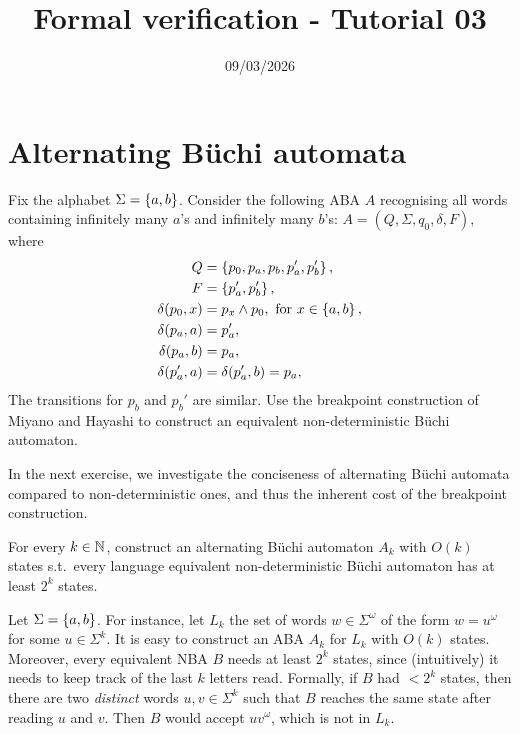 

\title{Formal verification - Tutorial 03}
\date{09/03/2026}



\maketitle

\section*{Alternating Büchi automata}

\begin{exercise}
	Fix the alphabet $\Sigma = \left\{a, b\right\}$.
	Consider the following ABA $A$ recognising all words containing infinitely many $a$'s and infinitely many $b$'s:
	$A = (Q, \Sigma, q_0, \delta, F)$, where
	\begin{align*}
		Q &= \left\{p_0, p_a, p_b, p_a', p_b'\right\}, \\
		F &= \left\{p_a', p_b'\right\}, \\
		\delta(p_0, x) &= p_x \wedge p_0, \text{ for } x \in \left\{a, b\right\}, \\
		\delta(p_a, a) &= p_a', \\
		\delta(p_a, b) &= p_a, \\
		\delta(p_a', a) &= \delta(p_a', b) = p_a, \\
	\end{align*}
	The transitions for $p_b$ and $p_b'$ are similar.
	Use the breakpoint construction of Miyano and Hayashi to construct an equivalent non-deterministic Büchi automaton.
\end{exercise}

In the next exercise, we investigate the conciseness of alternating Büchi automata compared to non-deterministic ones,
and thus the inherent cost of the breakpoint construction.
%
\begin{exercise}
	\label{ex:ABA conciseness}
	For every $k \in \mathbb N$, construct an alternating Büchi automaton $A_k$ with $O(k)$ states
	s.t.~every language equivalent non-deterministic Büchi automaton has at least $2^k$ states.
\end{exercise}
%
\begin{solution}
	Let $\Sigma = \left\{a, b\right\}$.
	For instance, let $L_k$ the set of words $w \in \Sigma^\omega$
	of the form $w = u^\omega$ for some $u \in \Sigma^k$.
	It is easy to construct an ABA $A_k$ for $L_k$ with $O(k)$ states.
	Moreover, every equivalent NBA $B$ needs at least $2^k$ states,
	since (intuitively) it needs to keep track of the last $k$ letters read.
	Formally, if $B$ had $< 2^k$ states, then there are two \emph{distinct} words $u, v \in \Sigma^k$
	such that $B$ reaches the same state after reading $u$ and $v$.
	Then $B$ would accept $uv^\omega$, which is not in $L_k$.
\end{solution}

